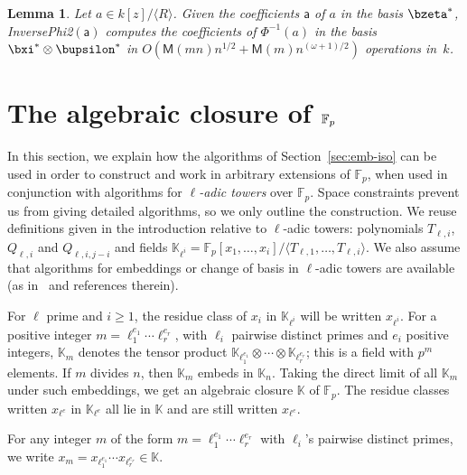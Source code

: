 \documentclass{sig-alternate}
\def\M {\ensuremath{\mathsf{M}}}
\def\F {\ensuremath{\mathbb{F}}}
\def\K {\ensuremath{\mathbb{K}}}
\def\va {\ensuremath{\mathsf{a}}}
\newcounter{algo}
\newcommand{\ang}[1]{\langle#1\rangle}
\newtheorem{Lemma}{Lemma}
\begin{document}
\begin{Lemma}\label{lemma:tiso2}
  Let $a\in k[z]/\ang{R}$. Given the coefficients $\va$ of $a$ in the
  basis $\bzeta^\ast$, {\sf InversePhi2}$(\va)$ computes the
  coefficients of $\Phi^{-1}(a)$ in the basis $\bxi^\ast \otimes
  \bupsilon^\ast$ in $O(\M(mn)n^{1/2}+\M(m) n^{(\omega+1)/2} )$
  operations in~$k$.
\end{Lemma}


{
\def\Fp{\F_p}
\section{The algebraic closure of \large$\protect\Fp$}\label{sec:fpbar}
}

In this section, we explain how the algorithms of
Section~\ref{sec:emb-iso} can be used in order to construct and work
in arbitrary extensions of $\F_p$, when used in conjunction with
algorithms for  {\em $\ell$-adic towers} over $\F_p$. Space
constraints prevent us from giving detailed algorithms, so we only
outline the construction. We reuse definitions given in the
introduction relative to $\ell$-adic towers: polynomials $T_{\ell,i}$,
$Q_{\ell,i}$ and $Q_{\ell,i,j-i}$ and fields
$\K_{\ell^i}=\F_p[x_1,\dots,x_i]/\langle
T_{\ell,1},\dots,T_{\ell,i}\rangle$. We also assume that algorithms
for embeddings or change of basis in $\ell$-adic towers are
available (as in~\cite{DeDoSc13} and references therein).

\smallskip{} For $\ell$ prime and $i \ge 1$,
the residue class of $x_i$ in $\K_{\ell^i}$ will be written
$x_{\ell^i}$. For a positive integer $m=\ell_1^{e_1}\cdots
\ell_r^{e_r}$, with $\ell_i$ pairwise distinct primes and $e_i$
positive integers, $\K_m$ denotes the tensor product
$\K_{\ell_1^{e_1}} \otimes \cdots \otimes \K_{\ell_r^{e_r}}$; this is
a field with $p^m$ elements.  If $m$ divides $n$, then $\K_m$ embeds
in $\K_n$. Taking the direct limit of all $\K_m$ under such
embeddings, we get an algebraic closure $\K$ of $\F_p$. The residue
classes written $x_{\ell^e}$ in $\K_{\ell^e}$ all lie in $\K$ and are
still written $x_{\ell^e}$.

For any integer $m$ of the form $m=\ell_1^{e_1}\cdots \ell_r^{e_r}$
with $\ell_i$'s pairwise distinct primes, we write $x_m =
x_{\ell_1^{e_1}} \cdots x_{\ell_r^{e_r}} \in \K$.
\end{document}
